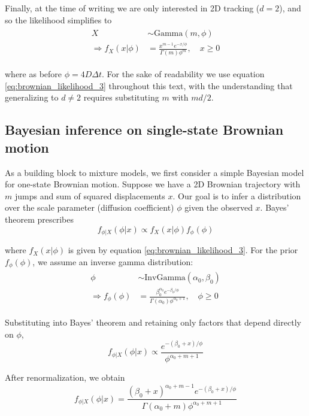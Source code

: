 \documentclass{article}
\begin{document}
Finally, at the time of writing we are only interested in 2D tracking ($d=2$),
and so the likelihood simplifies to
\begin{align}\begin{split}\label{eq:brownian_likelihood_3}
    X &\sim \text{Gamma} \left( m, \phi \right) \\
    \Rightarrow f_{X}(x | \phi) &= \frac{x^{m-1} e^{-x/\phi}}{\Gamma (m) \phi^{m}}, \quad x \geq 0
\end{split}\end{align}

where as before $\phi = 4 D \Delta t$.
For the sake of readability we use equation \ref{eq:brownian_likelihood_3}
throughout this text, with the understanding that generalizing to $d \neq 2$
requires substituting $m$ with $md / 2$.

\subsection{Bayesian inference on single-state Brownian motion}

As a building block to mixture models, we first consider a simple
Bayesian model for one-state Brownian motion. Suppose we have a
2D Brownian trajectory with $m$ jumps and sum of squared displacements $x$.
Our goal is to infer a distribution over the scale parameter (diffusion
coefficient) $\phi$ given the observed $x$. Bayes' theorem prescribes
\[
    f_{\phi | X}(\phi | x) \propto f_{X}(x | \phi) f_{\phi}(\phi)
\]

where $f_{X}(x | \phi)$ is given by equation \ref{eq:brownian_likelihood_3}.
For the prior $f_{\phi}(\phi)$, we assume an inverse gamma distribution:
\begin{align}\begin{split}\label{eq:inverse_gamma_prior}
    \phi &\sim \text{InvGamma} \left( \alpha_{0}, \beta_{0} \right) \\
    \Rightarrow f_{\phi} \left( \phi \right) &= \frac{\beta_{0}^{\alpha_{0}} e^{-\beta_{0} / \phi}}{\Gamma \left( \alpha_{0} \right) \phi^{\alpha_{0} + 1} }, \quad \phi \geq 0
\end{split}\end{align}

Substituting into Bayes' theorem and retaining only factors that depend
directly on $\phi$,
\[
    f_{\phi | X} (\phi | x) \propto \frac{
        e^{-(\beta_{0} + x) / \phi}
    }{
        \phi^{\alpha_{0} + m + 1}
    }
\]

After renormalization, we obtain
\[
    f_{\phi | X} (\phi | x) = \frac{ (\beta_{0} + x)^{\alpha_{0}+m-1} e^{-(\beta_{0} + x) / \phi}}{\Gamma (\alpha_{0} + m) \phi^{\alpha_{0} + m + 1}}
\]
\end{document}
